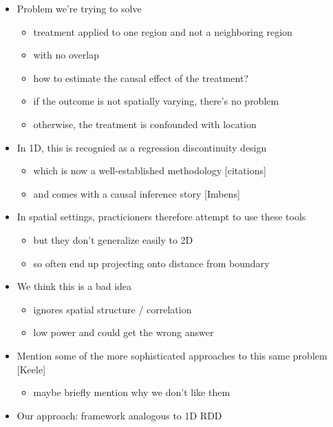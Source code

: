 \documentclass[letter]{article}
\providecommand{\tightlist}{%
      \setlength{\itemsep}{0pt}\setlength{\parskip}{0pt}}
\providecommand{\tightlist}{%
  	  \setlength{\itemsep}{0pt}\setlength{\parskip}{0pt}}
\begin{document}
\begin{itemize}
\tightlist
\item
  Problem we're trying to solve

  \begin{itemize}
  \tightlist
  \item
    treatment applied to one region and not a neighboring region
  \item
    with no overlap
  \item
    how to estimate the causal effect of the treatment?
  \item
    if the outcome is not spatially varying, there's no problem
  \item
    otherwise, the treatment is confounded with location
  \end{itemize}
\item
  In 1D, this is recognied as a regression discontinuity design

  \begin{itemize}
  \tightlist
  \item
    which is now a well-established methodology {[}citations{]}
  \item
    and comes with a causal inference story {[}Imbens{]}
  \end{itemize}
\item
  In spatial settings, practicioners therefore attempt to use these tools

  \begin{itemize}
  \tightlist
  \item
    but they don't generalize easily to 2D
  \item
    so often end up projecting onto distance from boundary
  \end{itemize}
\item
  We think this is a bad idea

  \begin{itemize}
  \tightlist
  \item
    ignores spatial structure / correlation
  \item
    low power and could get the wrong answer
  \end{itemize}
\item
  Mention some of the more sophisticated approaches to this same problem {[}Keele{]}

  \begin{itemize}
  \tightlist
  \item
    maybe briefly mention why we don't like them
  \end{itemize}
\item
  Our approach: framework analogous to 1D RDD


\end{itemize}
\end{document}

